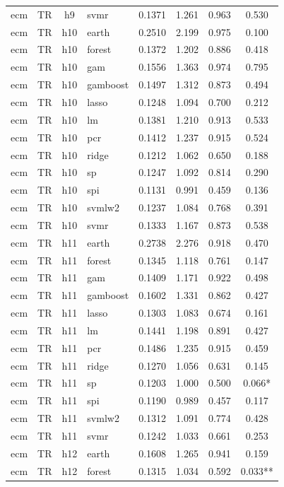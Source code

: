 \begin{ThreePartTable}
\begin{longtable}[t]{llclcccc}
ecm & TR & h9 & svmr & 0.1371 & 1.261 & 0.963 & 0.530\\
\addlinespace
ecm & TR & h10 & earth & 0.2510 & 2.199 & 0.975 & 0.100\\
ecm & TR & h10 & forest & 0.1372 & 1.202 & 0.886 & 0.418\\
ecm & TR & h10 & gam & 0.1556 & 1.363 & 0.974 & 0.795\\
ecm & TR & h10 & gamboost & 0.1497 & 1.312 & 0.873 & 0.494\\
ecm & TR & h10 & lasso & 0.1248 & 1.094 & 0.700 & 0.212\\
ecm & TR & h10 & lm & 0.1381 & 1.210 & 0.913 & 0.533\\
ecm & TR & h10 & pcr & 0.1412 & 1.237 & 0.915 & 0.524\\
ecm & TR & h10 & ridge & 0.1212 & 1.062 & 0.650 & 0.188\\
ecm & TR & h10 & sp & 0.1247 & 1.092 & 0.814 & 0.290\\
ecm & TR & h10 & spi & 0.1131 & 0.991 & 0.459 & 0.136\\
ecm & TR & h10 & svmlw2 & 0.1237 & 1.084 & 0.768 & 0.391\\
ecm & TR & h10 & svmr & 0.1333 & 1.167 & 0.873 & 0.538\\
\addlinespace
ecm & TR & h11 & earth & 0.2738 & 2.276 & 0.918 & 0.470\\
ecm & TR & h11 & forest & 0.1345 & 1.118 & 0.761 & 0.147\\
ecm & TR & h11 & gam & 0.1409 & 1.171 & 0.922 & 0.498\\
ecm & TR & h11 & gamboost & 0.1602 & 1.331 & 0.862 & 0.427\\
ecm & TR & h11 & lasso & 0.1303 & 1.083 & 0.674 & 0.161\\
ecm & TR & h11 & lm & 0.1441 & 1.198 & 0.891 & 0.427\\
ecm & TR & h11 & pcr & 0.1486 & 1.235 & 0.915 & 0.459\\
ecm & TR & h11 & ridge & 0.1270 & 1.056 & 0.631 & 0.145\\
ecm & TR & h11 & sp & 0.1203 & 1.000 & 0.500 & 0.066*\\
ecm & TR & h11 & spi & 0.1190 & 0.989 & 0.457 & 0.117\\
ecm & TR & h11 & svmlw2 & 0.1312 & 1.091 & 0.774 & 0.428\\
ecm & TR & h11 & svmr & 0.1242 & 1.033 & 0.661 & 0.253\\
\addlinespace
ecm & TR & h12 & earth & 0.1608 & 1.265 & 0.941 & 0.159\\
ecm & TR & h12 & forest & 0.1315 & 1.034 & 0.592 & 0.033**\\

\end{longtable}
\end{ThreePartTable}
